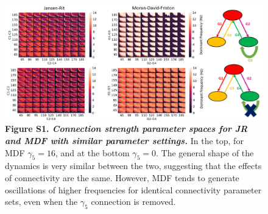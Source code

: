 \documentclass[12pt,twoside]{article}
\begin{document}



\begin{figure}[H]
    \centering
    \includegraphics[scale=0.5]{Images/MDF_Appendix.png}
    \caption*{\textbf{Figure S1.  \textit{Connection strength parameter spaces for JR and MDF with similar parameter settings.}} In the top, for MDF $\gamma_{5} = 16$, and at the bottom $\gamma_{5} = 0$. The general shape of the dynamics is very similar between the two, suggesting that the effects of connectivity are the same. However, MDF tends to generate oscillations of higher frequencies for identical connectivity parameter sets, even when the $\gamma_{5}$ connection is removed.}     
    \label{fig:LI_CS}
\end{figure}
\end{document}
